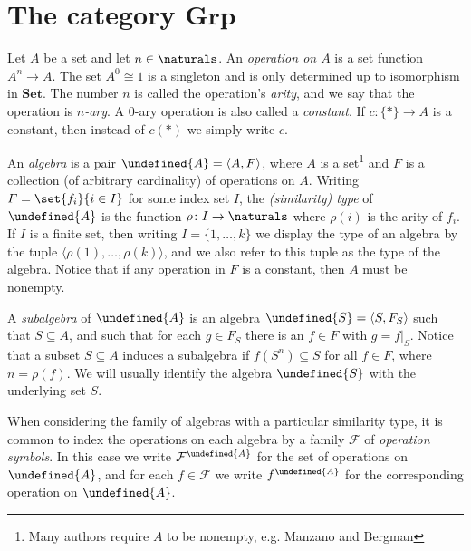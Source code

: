 \documentclass[article, a4paper, 11pt, oneside]{memoir}
\let\mathfrak\undefined
\numberwithin{equation}{chapter}
\newcommand{\calF}{\mathcal{F}}
\newcommand{\frakA}{\mathfrak{A}}
\newcommand{\ncat}[1]{\mathbf{#1}} %
\newcommand{\catSet}{\ncat{Set}} %
\newcommand{\catGrp}{\ncat{Grp}} %
\theoremstyle{nonumberplain}
\begin{document}
\section[The category Grp][The category $\catGrp$]{The category $\catGrp$}

\newcommand{\frakS}{\mathfrak{S}}

\begin{remarkbreak}
    Let $A$ be a set and let $n \in \naturals$. An \emph{operation on $A$} is a set function $A^n \to A$. The set $A^0 \cong 1$ is a singleton and is only determined up to isomorphism in $\catSet$. The number $n$ is called the operation's \emph{arity}, and we say that the operation is \emph{$n$-ary}. A $0$-ary operation is also called a \emph{constant}. If $c \colon \{*\} \to A$ is a constant, then instead of $c(*)$ we simply write $c$.
    
    An \emph{algebra} is a pair $\frakA = \langle A, F \rangle$, where $A$ is a set\footnote{Many authors require $A$ to be nonempty, e.g. Manzano and Bergman} and $F$ is a collection (of arbitrary cardinality) of operations on $A$. Writing $F = \set{f_i}{i \in I}$ for some index set $I$, the \emph{(similarity) type} of $\frakA$ is the function $\rho \colon I \to \naturals$ where $\rho(i)$ is the arity of $f_i$. If $I$ is a finite set, then writing $I = \{1, \ldots, k\}$ we display the type of an algebra by the tuple $\langle \rho(1), \ldots, \rho(k) \rangle$, and we also refer to this tuple as the type of the algebra. Notice that if any operation in $F$ is a constant, then $A$ must be nonempty.

    A \emph{subalgebra} of $\frakA$ is an algebra $\frakS = \langle S, F_S \rangle$ such that $S \subseteq A$, and such that for each $g \in F_S$ there is an $f \in F$ with $g = f|_S$. Notice that a subset $S \subseteq A$ induces a subalgebra if $f(S^n) \subseteq S$ for all $f \in F$, where $n = \rho(f)$. We will usually identify the algebra $\frakS$ with the underlying set $S$.

    When considering the family of algebras with a particular similarity type, it is common to index the operations on each algebra by a family $\calF$ of \emph{operation symbols}. In this case we write $\calF^\frakA$ for the set of operations on $\frakA$, and for each $f \in \calF$ we write $f^\frakA$ for the corresponding operation on $\frakA$.


\end{remarkbreak}
\end{document}
